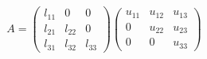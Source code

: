 \documentclass[preview]{standalone}
\begin{document}
\begin{align*}
A = \begin{pmatrix}l_{11} & 0 & 0 \\l_{21} & l_{22} & 0 \\l_{31} & l_{32} & l_{33}\end{pmatrix}\begin{pmatrix}u_{11} & u_{12} & u_{13} \\0 & u_{22} & u_{23} \\0 & 0 & u_{33}\end{pmatrix}
\end{align*}
\end{document}
